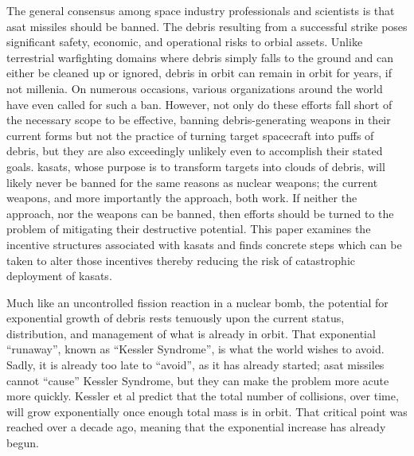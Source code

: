 
\maketitle

\pagestyle{execSummary}
\thispagestyle{firstPage}



The general consensus among space industry professionals and
scientists is that \ac{asat} missiles should be banned.  The debris
resulting from a successful strike poses significant safety, economic,
and operational risks to orbial assets.  Unlike terrestrial
warfighting domains where debris simply falls to the ground and can
either be cleaned up or ignored, debris in orbit can remain in orbit
for years, if not millenia.  On numerous occasions, various
organizations around the world have even called for such a ban.
However, not only do these efforts fall short of the necessary scope
to be effective, banning debris-generating weapons in their current
forms but not the practice of turning target spacecraft into puffs of
debris, but they are also exceedingly unlikely even to accomplish
their stated goals.  \acp{kasat}, whose purpose is to transform
targets into clouds of debris, will likely never be banned for the
same reasons as nuclear weapons; the current weapons, and more
importantly the approach, both work.  If neither the approach, nor the
weapons can be banned, then efforts should be turned to the problem of
mitigating their destructive potential.  This paper examines the
incentive structures associated with \acp{kasat} and finds concrete
steps which can be taken to alter those incentives thereby reducing
the risk of catastrophic deployment of \acp{kasat}.

Much like an uncontrolled fission reaction in a nuclear bomb, the
potential for exponential growth of debris rests tenuously upon the
current status, distribution, and management of what is already in
orbit.  That exponential ``runaway'', known as ``Kessler Syndrome'',
is what the world wishes to avoid.  Sadly, it is already too late to
``avoid'', as it has already started; \ac{asat} missiles cannot
``cause'' Kessler Syndrome, but they can make the problem more acute
more quickly.  Kessler et al predict that the total number of
collisions, over time, will grow exponentially once enough total mass
is in orbit.  That critical point was reached over a decade ago,
meaning that the exponential increase has already begun.

